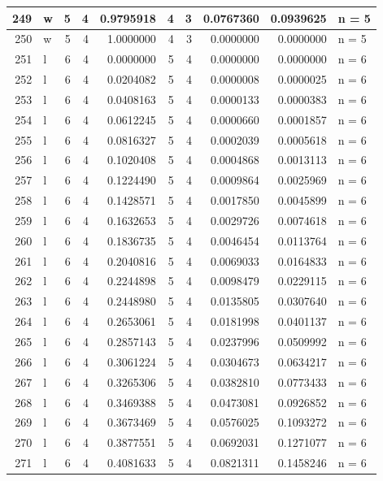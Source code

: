 \documentclass[
  letterpaper,
  DIV=11,
  numbers=noendperiod]{scrreprt}
\begin{document}
\begin{table}
\begin{tabular}[t]{r|l|r|r|r|r|r|r|r|l}
\hline
249 & w & 5 & 4 & 0.9795918 & 4 & 3 & 0.0767360 & 0.0939625 & n = 5\\
\hline
250 & w & 5 & 4 & 1.0000000 & 4 & 3 & 0.0000000 & 0.0000000 & n = 5\\
\hline
251 & l & 6 & 4 & 0.0000000 & 5 & 4 & 0.0000000 & 0.0000000 & n = 6\\
\hline
252 & l & 6 & 4 & 0.0204082 & 5 & 4 & 0.0000008 & 0.0000025 & n = 6\\
\hline
253 & l & 6 & 4 & 0.0408163 & 5 & 4 & 0.0000133 & 0.0000383 & n = 6\\
\hline
254 & l & 6 & 4 & 0.0612245 & 5 & 4 & 0.0000660 & 0.0001857 & n = 6\\
\hline
255 & l & 6 & 4 & 0.0816327 & 5 & 4 & 0.0002039 & 0.0005618 & n = 6\\
\hline
256 & l & 6 & 4 & 0.1020408 & 5 & 4 & 0.0004868 & 0.0013113 & n = 6\\
\hline
257 & l & 6 & 4 & 0.1224490 & 5 & 4 & 0.0009864 & 0.0025969 & n = 6\\
\hline
258 & l & 6 & 4 & 0.1428571 & 5 & 4 & 0.0017850 & 0.0045899 & n = 6\\
\hline
259 & l & 6 & 4 & 0.1632653 & 5 & 4 & 0.0029726 & 0.0074618 & n = 6\\
\hline
260 & l & 6 & 4 & 0.1836735 & 5 & 4 & 0.0046454 & 0.0113764 & n = 6\\
\hline
261 & l & 6 & 4 & 0.2040816 & 5 & 4 & 0.0069033 & 0.0164833 & n = 6\\
\hline
262 & l & 6 & 4 & 0.2244898 & 5 & 4 & 0.0098479 & 0.0229115 & n = 6\\
\hline
263 & l & 6 & 4 & 0.2448980 & 5 & 4 & 0.0135805 & 0.0307640 & n = 6\\
\hline
264 & l & 6 & 4 & 0.2653061 & 5 & 4 & 0.0181998 & 0.0401137 & n = 6\\
\hline
265 & l & 6 & 4 & 0.2857143 & 5 & 4 & 0.0237996 & 0.0509992 & n = 6\\
\hline
266 & l & 6 & 4 & 0.3061224 & 5 & 4 & 0.0304673 & 0.0634217 & n = 6\\
\hline
267 & l & 6 & 4 & 0.3265306 & 5 & 4 & 0.0382810 & 0.0773433 & n = 6\\
\hline
268 & l & 6 & 4 & 0.3469388 & 5 & 4 & 0.0473081 & 0.0926852 & n = 6\\
\hline
269 & l & 6 & 4 & 0.3673469 & 5 & 4 & 0.0576025 & 0.1093272 & n = 6\\
\hline
270 & l & 6 & 4 & 0.3877551 & 5 & 4 & 0.0692031 & 0.1271077 & n = 6\\
\hline
271 & l & 6 & 4 & 0.4081633 & 5 & 4 & 0.0821311 & 0.1458246 & n = 6\\

\end{tabular}
\end{table}
\end{document}

